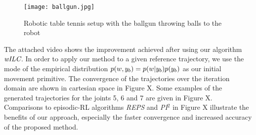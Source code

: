 

\begin{figure}
\center
\texttt{[image: ballgun.jpg]}			
\caption{Robotic table tennis setup with the ballgun throwing balls to the robot}
\label{barrettArm}
\end{figure}

The attached video shows the improvement achieved after using our algorithm $\emph{wILC}$. In order to apply our method to a given reference trajectory, we use the mode of the empirical distribution $p(w,y_b) = p(w|y_b)p(y_b)$ as our initial movement primitive. The convergence of the trajectories over the iteration domain are shown in cartesian space in Figure X. Some examples of the generated trajectories for the joints 5, 6 and 7 are given in Figure X. Comparisons to episodic-RL algorithms \emph{REPS} and \emph{PI$^{2}$} in Figure X illustrate the benefits of our approach, especially the faster convergence and increased accuracy of the proposed method.